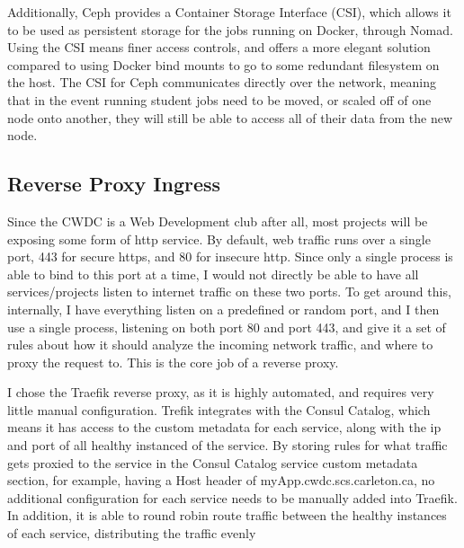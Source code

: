 \documentclass{article}
\begin{document}
Additionally, Ceph provides a Container Storage Interface (CSI), which allows it to be used as persistent storage for the jobs running on Docker, through Nomad. Using the CSI means finer access controls, and offers a more elegant solution compared to using Docker bind mounts to go to some redundant filesystem on the host. The CSI for Ceph communicates directly over the network, meaning that in the event running student jobs need to be moved, or scaled off of one node onto another, they will still be able to access all of their data from the new node.

\subsection{Reverse Proxy Ingress}
Since the CWDC is a Web Development club after all, most projects will be exposing some form of http service. By default, web traffic runs over a single port, 443 for secure https, and 80 for insecure http. Since only a single process is able to bind to this port at a time, I would not directly be able to have all services/projects listen to internet traffic on these two ports. To get around this, internally, I have everything listen on a predefined or random port, and I then use a single process, listening on both port 80 and port 443, and give it a set of rules about how it should analyze the incoming network traffic, and where to proxy the request to. This is the core job of a reverse proxy.

I chose the Traefik reverse proxy, as it is highly automated, and requires very little manual configuration. Trefik integrates with the Consul Catalog, which means it has access to the custom metadata for each service, along with the ip and port of all healthy instanced of the service. By storing rules for what traffic gets proxied to the service in the Consul Catalog service custom metadata section, for example, having a Host header of myApp.cwdc.scs.carleton.ca, no additional configuration for each service needs to be manually added into Traefik. In addition, it is able to round robin route traffic between the healthy instances of each service, distributing the traffic evenly
\end{document}
